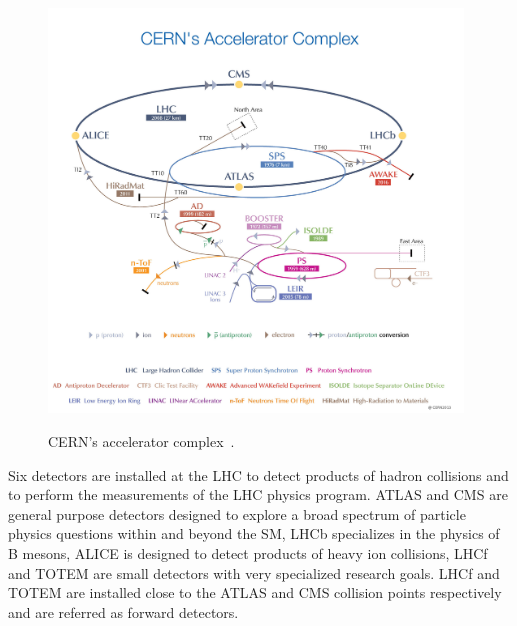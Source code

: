 \begin{figure}[htb]
  \begin{center}
    {\includegraphics[width=0.98\textwidth]{../figs/Exp/CERN_accelerator_complex2013.jpg}}
    \caption{CERN's accelerator complex~\cite{ref_fig_CERNacceleratorComplex}.}
    \label{fig:CERN_accelerator_complex}
  \end{center}
\end{figure}




Six detectors are installed at the LHC to detect products of hadron collisions and to perform the measurements of the LHC physics program. ATLAS and CMS are general purpose detectors designed to explore a broad spectrum of particle physics questions within and beyond the SM, LHCb specializes in the physics of B mesons, ALICE is designed to detect products of heavy ion collisions, LHCf and TOTEM are small detectors with very specialized research goals. LHCf and TOTEM are installed close to the ATLAS and CMS collision points respectively and are referred as forward detectors. 

